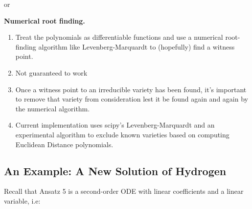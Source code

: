 \documentclass{article}
\def\coeff{\framebox(10,10){}}
\newcommand{\tikzmark}[1]{\tikz[overlay,remember picture] \node (#1) {};}
\begin{document}
\begin{enumerate}
\begin{enumerate}
\end{enumerate}

or

{\bf Numerical root finding.}

\begin{enumerate}

\item Treat the polynomials as differentiable functions and use a numerical root-finding algorithm
like Levenberg-Marquardt to (hopefully) find a witness point.

\item Not guaranteed to work

\item Once a witness point to an irreducible variety has been found, it's important to remove
that variety from consideration lest it be found again and again by the numerical algorithm.

\item Current implementation uses scipy's Levenberg-Marquardt and an experimental algorithm
to exclude known varieties based on computing Euclidean Distance polynomials.

\end{enumerate}

\end{enumerate}

\subsection*{An Example: A New Solution of Hydrogen}


Recall that Ansatz 5 is a second-order ODE with linear coefficients and a linear variable, i.e:

\end{document}
